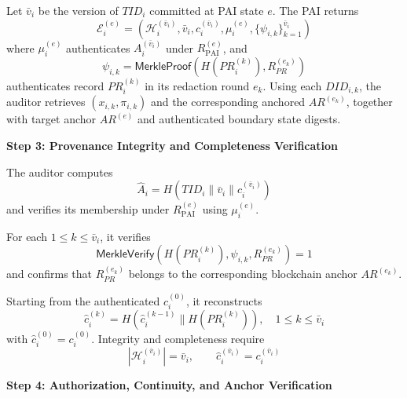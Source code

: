 \documentclass[lettersize,journal]{IEEEtran}
\begin{document}
Let $\bar v_i$ be the version of $TID_i$ committed at PAI state $e$.
The PAI returns
\begin{equation}
\mathcal{E}_i^{(e)}
=
\left(
\mathcal{H}_i^{(\bar v_i)},\bar v_i,c_i^{(\bar v_i)},
\mu_i^{(e)},\{\psi_{i,k}\}_{k=1}^{\bar v_i}
\right)
\label{eq:audit-evidence}
\end{equation}
where $\mu_i^{(e)}$ authenticates
$A_i^{(\bar v_i)}$ under $R_{\mathrm{PAI}}^{(e)}$, and
\begin{equation}
\psi_{i,k}
=
\mathsf{MerkleProof}
\left(H(PR_i^{(k)}),R_{PR}^{(e_k)}\right)
\label{eq:record-path}
\end{equation}
authenticates record $PR_i^{(k)}$ in its redaction round $e_k$.
Using each $DID_{i,k}$, the auditor retrieves $(x_{i,k},\pi_{i,k})$
and the corresponding anchored $AR^{(e_k)}$, together with target
anchor $AR^{(e)}$ and authenticated boundary state digests.

\smallskip
\noindent\textbf{Step 3: Provenance Integrity and Completeness Verification}

The auditor computes
\begin{equation}
\widehat A_i
=
H(TID_i\parallel\bar v_i\parallel c_i^{(\bar v_i)})
\label{eq:audit-entry}
\end{equation}
and verifies its membership under $R_{\mathrm{PAI}}^{(e)}$ using
$\mu_i^{(e)}$. 

For each $1\le k\le\bar v_i$, it verifies
\begin{equation}
\mathsf{MerkleVerify}
\left(H(PR_i^{(k)}),\psi_{i,k},R_{PR}^{(e_k)}\right)=1
\label{eq:audit-record-merkle}
\end{equation}
and confirms that $R_{PR}^{(e_k)}$ belongs to the corresponding
blockchain anchor $AR^{(e_k)}$.

Starting from the authenticated $c_i^{(0)}$, it reconstructs
\begin{equation}
\widehat c_i^{(k)}
=
H\left(
\widehat c_i^{(k-1)}\parallel H(PR_i^{(k)})
\right),
\quad
1\le k\le\bar v_i
\label{eq:audit-chain}
\end{equation}
with $\widehat c_i^{(0)}=c_i^{(0)}$. Integrity and completeness require
\begin{equation}
|\mathcal H_i^{(\bar v_i)}|=\bar v_i,\qquad
\widehat c_i^{(\bar v_i)}=c_i^{(\bar v_i)}
\label{eq:audit-completeness}
\end{equation}

\smallskip
\smallskip
\noindent\textbf{Step 4: Authorization, Continuity, and Anchor Verification}
\end{document}
